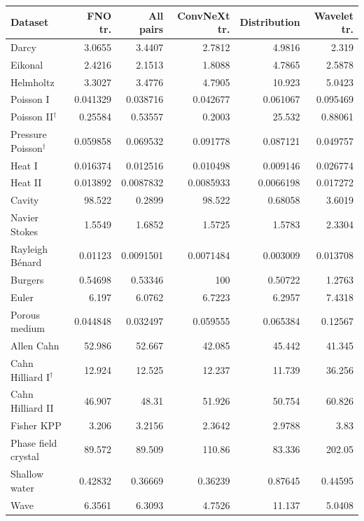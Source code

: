 \begin{tabular}{lrrrrr}
\toprule
Dataset & FNO tr. & All pairs & ConvNeXt tr. & Distribution & Wavelet tr. \\
\midrule
Darcy & 3.0655 & 3.4407 & 2.7812 & 4.9816 & 2.319 \\
Eikonal & 2.4216 & 2.1513 & 1.8088 & 4.7865 & 2.5878 \\
Helmholtz & 3.3027 & 3.4776 & 4.7905 & 10.923 & 5.0423 \\
Poisson I & 0.041329 & 0.038716 & 0.042677 & 0.061067 & 0.095469 \\
Poisson II$^{\dagger}$ & 0.25584 & 0.53557 & 0.2003 & 25.532 & 0.88061 \\
Pressure Poisson$^{\dagger}$ & 0.059858 & 0.069532 & 0.091778 & 0.087121 & 0.049757 \\
Heat I & 0.016374 & 0.012516 & 0.010498 & 0.009146 & 0.026774 \\
Heat II & 0.013892 & 0.0087832 & 0.0085933 & 0.0066198 & 0.017272 \\
Cavity & 98.522 & 0.2899 & 98.522 & 0.68058 & 3.6019 \\
Navier Stokes & 1.5549 & 1.6852 & 1.5725 & 1.5783 & 2.3304 \\
Rayleigh Bénard & 0.01123 & 0.0091501 & 0.0071484 & 0.003009 & 0.013708 \\
Burgers & 0.54698 & 0.53346 & 100 & 0.50722 & 1.2763 \\
Euler & 6.197 & 6.0762 & 6.7223 & 6.2957 & 7.4318 \\
Porous medium & 0.044848 & 0.032497 & 0.059555 & 0.065384 & 0.12567 \\
Allen Cahn & 52.986 & 52.667 & 42.085 & 45.442 & 41.345 \\
Cahn Hilliard I$^{\dagger}$ & 12.924 & 12.525 & 12.237 & 11.739 & 36.256 \\
Cahn Hilliard II & 46.907 & 48.31 & 51.926 & 50.754 & 60.826 \\
Fisher KPP & 3.206 & 3.2156 & 2.3642 & 2.9788 & 3.83 \\
Phase field crystal & 89.572 & 89.509 & 110.86 & 83.336 & 202.05 \\
Shallow water & 0.42832 & 0.36669 & 0.36239 & 0.87645 & 0.44595 \\
Wave & 6.3561 & 6.3093 & 4.7526 & 11.137 & 5.0408 \\
\bottomrule
\end{tabular}
